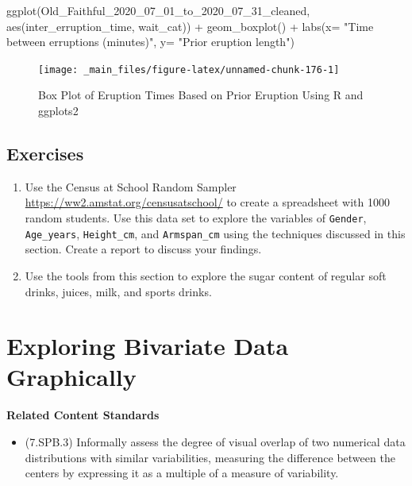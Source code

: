 \documentclass[
]{book}
\newenvironment{Shaded}{\begin{snugshade}}{\end{snugshade}}
\newcommand{\AttributeTok}[1]{\textcolor[rgb]{0.77,0.63,0.00}{#1}}
\newcommand{\FunctionTok}[1]{\textcolor[rgb]{0.00,0.00,0.00}{#1}}
\newcommand{\NormalTok}[1]{#1}
\newcommand{\SpecialCharTok}[1]{\textcolor[rgb]{0.00,0.00,0.00}{#1}}
\newcommand{\StringTok}[1]{\textcolor[rgb]{0.31,0.60,0.02}{#1}}
\providecommand{\tightlist}{%
  \setlength{\itemsep}{0pt}\setlength{\parskip}{0pt}}
\newenvironment{standards}{}{}
\theoremstyle{definition}
\theoremstyle{definition}
\theoremstyle{definition}
\theoremstyle{definition}
\theoremstyle{remark}
\begin{document}
\begin{Shaded}
\begin{Highlighting}[]
\FunctionTok{ggplot}\NormalTok{(Old\_Faithful\_2020\_07\_01\_to\_2020\_07\_31\_cleaned, }\FunctionTok{aes}\NormalTok{(inter\_erruption\_time, wait\_cat)) }\SpecialCharTok{+} \FunctionTok{geom\_boxplot}\NormalTok{() }\SpecialCharTok{+} \FunctionTok{labs}\NormalTok{(}\AttributeTok{x=} \StringTok{"Time between erruptions (minutes)"}\NormalTok{, }\AttributeTok{y=} \StringTok{"Prior eruption length"}\NormalTok{)}
\end{Highlighting}
\end{Shaded}

\begin{figure}

{\centering \texttt{[image: \_main\_files/figure-latex/unnamed-chunk-176-1]} 

}

\caption{Box Plot of Eruption Times Based on Prior Eruption Using R and ggplots2}\label{fig:unnamed-chunk-176}
\end{figure}

\hypertarget{exercises-61}{%
\subsection{Exercises}\label{exercises-61}}

\begin{enumerate}
\def\labelenumi{\arabic{enumi}.}
\item
  Use the Census at School Random Sampler \url{https://ww2.amstat.org/censusatschool/} to create a spreadsheet with 1000 random students. Use this data set to explore the variables of \texttt{Gender}, \texttt{Age\_years}, \texttt{Height\_cm}, and \texttt{Armspan\_cm} using the techniques discussed in this section. Create a report to discuss your findings.
\item
  Use the tools from this section to explore the sugar content of regular soft drinks, juices, milk, and sports drinks.
\end{enumerate}

\hypertarget{exploring-bivariate-data-graphically}{%
\section{Exploring Bivariate Data Graphically}\label{exploring-bivariate-data-graphically}}

\begin{standards}

\begin{center}
\textbf{Related Content Standards}

\end{center}

\begin{itemize}
\tightlist
\item
  (7.SPB.3) Informally assess the degree of visual overlap of two numerical data distributions with similar variabilities, measuring the difference between the centers by expressing it as a multiple of a measure of variability.
\end{itemize}

\end{standards}
\end{document}
